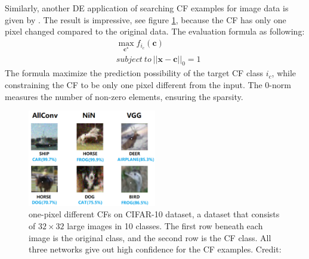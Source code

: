 Similarly, another DE application of searching CF examples for image data is given by \citeauthor{onePixel} \cite{onePixel}. The result is impressive, see figure \ref{fig:onepixel}, because the CF has only one pixel changed compared to the original data. The evaluation formula as following:
\begin{equation}\label{eq:onepixel}
  \begin{split}
     &\max_{\mathbf c^\star} f_{i_c}(\mathbf{c})\\
     &subject\ to\ ||\mathbf{x-c}||_0=1
  \end{split}
\end{equation}
The formula maximize the prediction possibility of the target CF class $i_c$, while constraining the CF to be only one pixel different from the input. The 0-norm measures the number of non-zero elements, ensuring the sparsity.
\begin{figure}
  \centering
  \includegraphics[width=0.5\textwidth]{onepixel.PNG}
  \caption{one-pixel different CFs on CIFAR-10 dataset, a dataset that consists of $32\times32$ large images in 10 classes.
  The first row beneath each image is the original class, and the second row is the CF class. All three networks give out high confidence for the CF examples. Credit: \cite{onePixel}
  }
  \label{fig:onepixel}
\end{figure}

